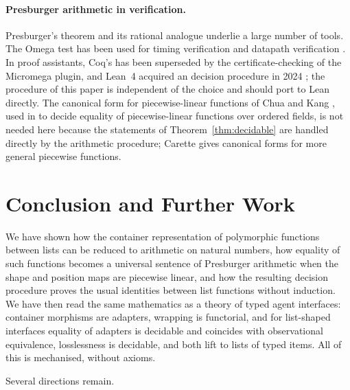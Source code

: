 \documentclass{fundam}
\begin{document}
\paragraph{Presburger arithmetic in verification.}  Presburger's theorem \cite{Presburger29}
and its rational analogue \cite{KreiselKrivine67} underlie a large number of tools.  The
Omega test \cite{Pugh91} has been used for timing verification \cite{AmonBHL97} and
datapath verification \cite{BrinkmannDrechsler02,JohannsenDrechsler01}.  In proof
assistants, Coq's  has been superseded by the certificate-checking 
of the Micromega plugin, and Lean~4 acquired an  decision procedure in 2024
\cite{Lean470}; the procedure of this paper is independent of the choice and should port
to Lean directly.  The canonical form for piecewise-linear functions of Chua and Kang
\cite{ChuaKang77}, used in \cite[Ch.~5]{Prince10} to decide equality of piecewise-linear
functions over ordered fields, is not needed here because the statements of
Theorem~\ref{thm:decidable} are handled directly by the arithmetic procedure; Carette
\cite{Carette07} gives canonical forms for more general piecewise functions.

\section{Conclusion and Further Work}\label{sec:conclusion}

We have shown how the container representation of polymorphic functions between lists can
be reduced to arithmetic on natural numbers, how equality of such functions becomes a
universal sentence of Presburger arithmetic when the shape and position maps are
piecewise linear, and how the resulting decision procedure proves the usual identities
between list functions without induction.  We have then read the same mathematics as a
theory of typed agent interfaces: container morphisms are adapters, wrapping is
functorial, and for list-shaped interfaces equality of adapters is decidable and
coincides with observational equivalence, losslessness is decidable, and both lift to
lists of typed items.  All of this is mechanised, without axioms.

Several directions remain.
\end{document}
